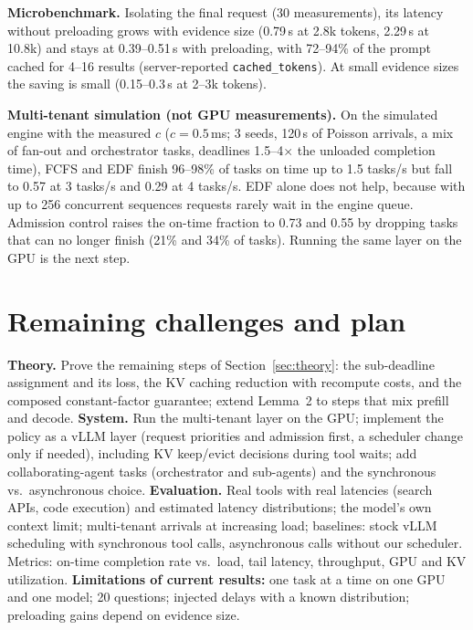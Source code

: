 \documentclass{article}
\begin{document}
\textbf{Microbenchmark.} Isolating the final request (30 measurements), its latency without preloading grows
with evidence size (0.79\,s at 2.8k tokens, 2.29\,s at 10.8k) and stays at 0.39--0.51\,s with preloading, with
72--94\% of the prompt cached for 4--16 results (server-reported \texttt{cached\_tokens}). At small evidence
sizes the saving is small (0.15--0.3\,s at 2--3k tokens).

\textbf{Multi-tenant simulation (not GPU measurements).} On the simulated engine with the measured $c$
($c=0.5$\,ms; 3 seeds, 120\,s of Poisson arrivals, a mix of fan-out and orchestrator tasks, deadlines 1.5--4$\times$
the unloaded completion time), FCFS and EDF finish 96--98\% of tasks on time up to 1.5 tasks/s but fall to 0.57
at 3 tasks/s and 0.29 at 4 tasks/s. EDF alone does not help, because with up to 256 concurrent sequences requests
rarely wait in the engine queue. Admission control raises the on-time fraction to 0.73 and 0.55 by dropping
tasks that can no longer finish (21\% and 34\% of tasks). Running the same layer on the GPU is the next step.

\section{Remaining challenges and plan}
\label{sec:plan}
\textbf{Theory.} Prove the remaining steps of Section~\ref{sec:theory}: the sub-deadline assignment and its
loss, the KV caching reduction with recompute costs, and the composed constant-factor guarantee; extend
Lemma~2 to steps that mix prefill and decode. \textbf{System.} Run the multi-tenant layer on the GPU; implement the policy as a vLLM layer (request priorities and admission first, a scheduler change
only if needed), including KV keep/evict decisions during tool waits; add collaborating-agent tasks
(orchestrator and sub-agents) and the synchronous vs.\ asynchronous choice. \textbf{Evaluation.} Real tools
with real latencies (search APIs, code execution) and estimated latency distributions; the model's own context
limit; multi-tenant arrivals at increasing load; baselines: stock vLLM scheduling with synchronous tool calls,
asynchronous calls without our scheduler. Metrics: on-time completion
rate vs.\ load, tail latency, throughput, GPU and KV utilization. \textbf{Limitations of current results:} one
task at a time on one GPU and one model; 20 questions; injected delays with a known distribution; preloading
gains depend on evidence size.



\end{document}
